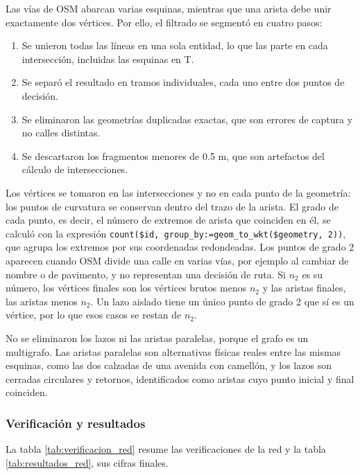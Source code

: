Las vías de OSM abarcan varias esquinas, mientras que una arista debe unir exactamente dos vértices. Por ello, el filtrado se segmentó en cuatro pasos:

\begin{enumerate}
    \item Se unieron todas las líneas en una sola entidad, lo que las parte en cada intersección, incluidas las esquinas en T.
    \item Se separó el resultado en tramos individuales, cada uno entre dos puntos de decisión.
    \item Se eliminaron las geometrías duplicadas exactas, que son errores de captura y no calles distintas.
    \item Se descartaron los fragmentos menores de 0.5 m, que son artefactos del cálculo de intersecciones.
\end{enumerate}

Los vértices se tomaron en las intersecciones y no en cada punto de la geometría: los puntos de curvatura se conservan dentro del trazo de la arista. El grado de cada punto, es decir, el número de extremos de arista que coinciden en él, se calculó con la expresión \texttt{count(\$id, group\_by:=geom\_to\_wkt(\$geometry, 2))}, que agrupa los extremos por sus coordenadas redondeadas. Los puntos de grado 2 aparecen cuando OSM divide una calle en varias vías, por ejemplo al cambiar de nombre o de pavimento, y no representan una decisión de ruta. Si $n_2$ es su número, los vértices finales son los vértices brutos menos $n_2$ y las aristas finales, las aristas menos $n_2$. Un lazo aislado tiene un único punto de grado 2 que sí es un vértice, por lo que esos casos se restan de $n_2$.

No se eliminaron los lazos ni las aristas paralelas, porque el grafo es un multigrafo. Las aristas paralelas son alternativas físicas reales entre las mismas esquinas, como las dos calzadas de una avenida con camellón, y los lazos son cerradas circulares y retornos, identificados como aristas cuyo punto inicial y final coinciden.

\subsubsection{Verificación y resultados}

La tabla \ref{tab:verificacion_red} resume las verificaciones de la red y la tabla \ref{tab:resultados_red}, sus cifras finales.


